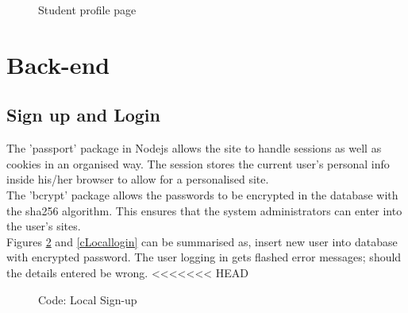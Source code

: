 \documentclass[a4paper,12pt]{article}
\numberwithin{equation}{section} %
\numberwithin{figure}{section}
\begin{document}
\begin{figure}[H]
\centering
{}
\caption{Student profile page}
\label{studentProfile}
\end{figure}

\pagebreak
\section{Back-end}
\subsection{Sign up and Login}
The 'passport' package in Nodejs allows the site to handle sessions as well as cookies in an organised way. The session stores the current user's personal info inside his/her browser to allow for a personalised site.\\
The 'bcrypt' package allows the passwords to be encrypted in the database with the sha256 algorithm. This ensures that the system administrators can enter into the user's sites.\\
Figures \ref{cLocalSignup} and \ref{cLocallogin} can be summarised as, insert new user into database with encrypted password. The user logging in gets flashed error messages; should the details entered be wrong.
<<<<<<< HEAD


\begin{figure}[H]
\centering
{}
\caption{Code: Local Sign-up}
\label{cLocalSignup}
\end{figure}
\end{document}
